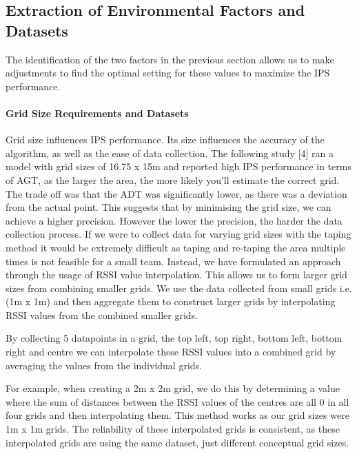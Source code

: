 \documentclass[conference]{IEEEtran}
\begin{document}
	
	\subsection{Extraction of Environmental Factors and Datasets}
	The identification of the two factors in the previous section allows us to make adjustments to find the optimal setting for these values to maximize the IPS performance.
	
	\paragraph{Grid Size Requirements and Datasets} Grid size influences IPS performance. Its size influences the accuracy of the algorithm, as well as the ease of data collection. The following study [4] ran a model with grid sizes of 16.75 x 15m and reported high IPS performance in terms of AGT, as the larger the area, the more likely you’ll estimate the correct grid. The trade off was that the ADT was significantly lower, as there was a deviation from the actual point. This suggests that by minimising the grid size, we can achieve a higher precision. However the lower the precision, the harder the data collection process. 
	If we were to collect data for varying grid sizes with the taping method it would be extremely difficult as taping and re-taping the area multiple times is not feasible for a small team. Instead, we have formulated an approach through the usage of RSSI value interpolation. This allows us to form larger grid sizes from combining smaller grids. We use the data collected from small grids i.e. (1m x 1m) and then aggregate them to construct larger grids by interpolating RSSI values from the combined smaller grids.
	
	By collecting 5 datapoints in a grid, the top left, top right, bottom left, bottom right and centre we can interpolate these RSSI values into a combined grid by averaging the values from the individual grids.
	
	For example, when creating a 2m x 2m grid, we do this by determining a value where the sum of distances between the RSSI values of the centres are all 0 in all four grids and then interpolating them. This method works as our grid sizes were 1m x 1m grids. The reliability of these interpolated grids is consistent, as these interpolated grids are using the same dataset, just different conceptual grid sizes.
	
\end{document}
